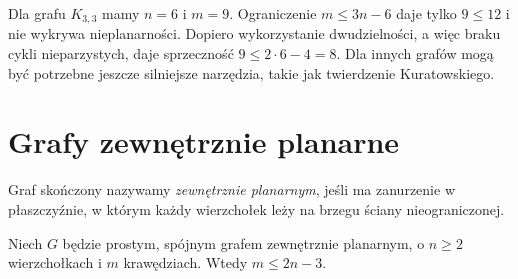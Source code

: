 \begin{przyklad}
Dla grafu $K_{3,3}$ mamy $n=6$ i $m=9$.
Ograniczenie $m\le3n-6$ daje tylko $9\le12$ i nie wykrywa
nieplanarności. Dopiero wykorzystanie dwudzielności,
a więc braku cykli nieparzystych, daje sprzeczność
$9\le2\cdot6-4=8$. Dla innych grafów mogą być potrzebne
jeszcze silniejsze narzędzia, takie jak twierdzenie Kuratowskiego.
\end{przyklad}

\section{Grafy zewnętrznie planarne}
\label{sec:tg-outerplanar}

\begin{definicja}
Graf skończony nazywamy \emph{zewnętrznie planarnym}, jeśli
ma zanurzenie w płaszczyźnie, w którym każdy wierzchołek
leży na brzegu ściany nieograniczonej.
\end{definicja}

\begin{twierdzenie}
Niech $G$ będzie prostym, spójnym grafem zewnętrznie planarnym,
o $n\ge2$ wierzchołkach i $m$ krawędziach. Wtedy
$m\le2n-3$.
\end{twierdzenie}

